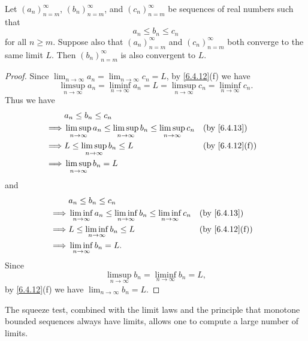 \begin{cor}\label{6.4.14}
  Let \((a_n)_{n = m}^\infty\), \((b_n)_{n = m}^\infty\), and \((c_n)_{n = m}^\infty\) be sequences of real numbers such that
  \[
    a_n \leq b_n \leq c_n
  \]
  for all \(n \geq m\).
  Suppose also that \((a_n)_{n = m}^\infty\) and \((c_n)_{n = m}^\infty\) both converge to the same limit \(L\).
  Then \((b_n)_{n = m}^\infty\) is also convergent to \(L\).
\end{cor}

\begin{proof}
  Since \(\lim_{n \to \infty} a_n = \lim_{n \to \infty} c_n = L\), by \cref{6.4.12}(f) we have
  \[
    \limsup_{n \to \infty} a_n = \liminf_{n \to \infty} a_n = L = \limsup_{n \to \infty} c_n = \liminf_{n \to \infty} c_n.
  \]
  Thus we have
  \begin{align*}
             & a_n \leq b_n \leq c_n                                                                                                        \\
    \implies & \limsup_{n \to \infty} a_n \leq \limsup_{n \to \infty} b_n \leq \limsup_{n \to \infty} c_n &  & \text{(by \cref{6.4.13})}    \\
    \implies & L \leq \limsup_{n \to \infty} b_n \leq L                                                   &  & \text{(by \cref{6.4.12}(f))} \\
    \implies & \limsup_{n \to \infty} b_n = L
  \end{align*}
  and
  \begin{align*}
             & a_n \leq b_n \leq c_n                                                                                                        \\
    \implies & \liminf_{n \to \infty} a_n \leq \liminf_{n \to \infty} b_n \leq \liminf_{n \to \infty} c_n &  & \text{(by \cref{6.4.13})}    \\
    \implies & L \leq \liminf_{n \to \infty} b_n \leq L                                                   &  & \text{(by \cref{6.4.12}(f))} \\
    \implies & \liminf_{n \to \infty} b_n = L.
  \end{align*}
  Since
  \[
    \limsup_{n \to \infty} b_n = \liminf_{n \to \infty} b_n = L,
  \]
  by \cref{6.4.12}(f) we have \(\lim_{n \to \infty} b_n = L\).
\end{proof}

\setcounter{thm}{15}
\begin{rmk}\label{6.4.16}
  The squeeze test, combined with the limit laws and the principle that monotone bounded sequences always have limits, allows one to compute a large number of limits.
\end{rmk}

